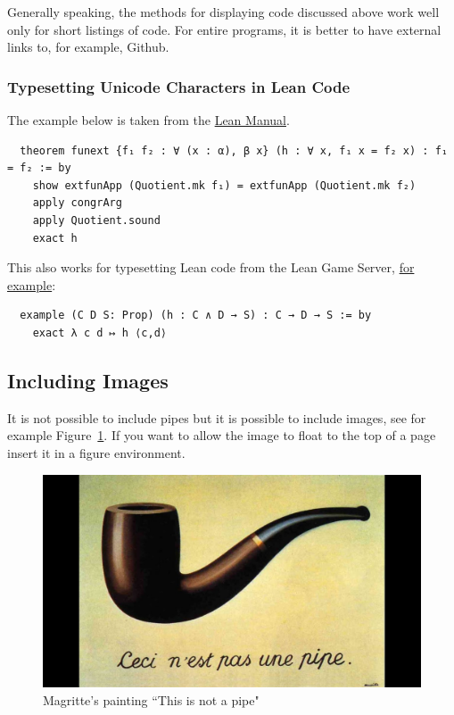 \documentclass{article}
\theoremstyle{plain}
\theoremstyle{definition}
\theoremstyle{remark}
\begin{document}
Generally speaking,  the methods for displaying code discussed above work well only for short listings of code. For entire programs, it is better to have external links to, for example, Github.


\subsubsection{Typesetting Unicode Characters in Lean Code}

The example below is taken from the \href{https://lean-lang.org/lean4/doc/syntax_highlight_in_latex.html}{Lean Manual}.

\lstset{language=lean}
\begin{lstlisting}
  theorem funext {f₁ f₂ : ∀ (x : α), β x} (h : ∀ x, f₁ x = f₂ x) : f₁ = f₂ := by
    show extfunApp (Quotient.mk f₁) = extfunApp (Quotient.mk f₂)
    apply congrArg
    apply Quotient.sound
    exact h
\end{lstlisting} 


This also works for typesetting Lean code from the Lean Game Server, \href{https://adam.math.hhu.de/#/g/trequetrum/lean4game-logic/world/ImpIntro/level/6}{for example}:

\begin{lstlisting}
  example (C D S: Prop) (h : C ∧ D → S) : C → D → S := by
    exact λ c d ↦ h ⟨c,d⟩ 
\end{lstlisting}

\subsection{Including Images}

It is not possible to include pipes but it is possible to include images, see for example Figure~\ref{pipe}. If you want to allow the image to float to the top of a page insert it in a figure environment. 

\begin{figure}
\begin{center}
\includegraphics[scale=0.2]{cecinestpasunepipe.jpg}
\end{center}
\caption{Magritte's painting ``This is not a pipe"}\label{pipe}
\end{figure}
\end{document}
